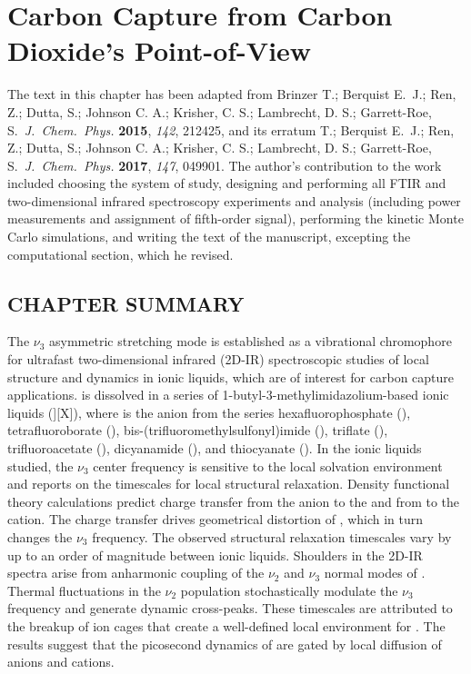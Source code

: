 \chapter[Anion Dependence]{Carbon Capture from Carbon Dioxide's Point-of-View}
\label{ch:anions}
The text in this chapter has been adapted from Brinzer T.; Berquist E.\ J.; Ren, Z.; Dutta, S.; Johnson C. A.; Krisher, C. S.; Lambrecht, D. S.; Garrett-Roe, S.\ \textit{J.\ Chem.\ Phys.} \textbf{2015}, \textit{142}, 212425, and its erratum T.; Berquist E.\ J.; Ren, Z.; Dutta, S.; Johnson C. A.; Krisher, C. S.; Lambrecht, D. S.; Garrett-Roe, S.\ \textit{J.\ Chem.\ Phys.} \textbf{2017}, \textit{147}, 049901. The author's contribution to the work included choosing the system of study, designing and performing all FTIR and two-dimensional infrared spectroscopy experiments and analysis (including power measurements and assignment of fifth-order signal), performing the kinetic Monte Carlo simulations, and writing the text of the manuscript, excepting the computational section, which he revised.

\section{CHAPTER SUMMARY}
The  $\nu_3$ asymmetric stretching mode is established as a vibrational chromophore for ultrafast two-dimensional infrared (2D-IR) spectroscopic studies of local structure and dynamics in ionic liquids, which are of interest for carbon capture applications.  is dissolved in a series of 1-butyl-3-methylimidazolium-based ionic liquids (\ce{[Im_{4,1}}][X]), where \ce{[X]-} is the anion from the series hexafluorophosphate (), tetrafluoroborate (), bis-(trifluoromethyl\-sulfonyl)imide (), triflate (), trifluoroacetate (), dicyanamide (), and thiocyanate (). In the ionic liquids studied, the $\nu_3$ center frequency is sensitive to the local solvation environment and reports on the timescales for local structural relaxation. Density functional theory calculations predict charge transfer from the anion to the  and from  to the cation. The charge transfer drives geometrical distortion of , which in turn changes the $\nu_3$ frequency. The observed structural relaxation timescales vary by up to an order of magnitude between ionic liquids. Shoulders in the 2D-IR spectra arise from anharmonic coupling of the $\nu_2$ and $\nu_3$ normal modes of . Thermal fluctuations in the $\nu_2$ population stochastically modulate the $\nu_3$ frequency and generate dynamic cross-peaks. These timescales are attributed to the breakup of ion cages that create a well-defined local environment for . The results suggest that the picosecond dynamics of  are gated by local diffusion of anions and cations.

